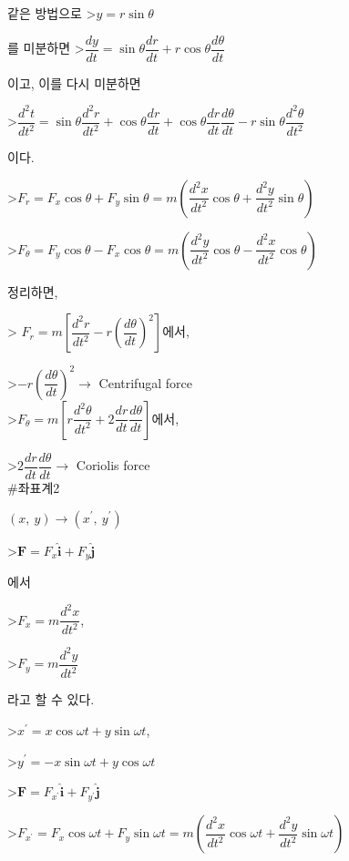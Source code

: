 같은 방법으로 
>$ y = r \sin \theta $ 

를 미분하면
>$\dfrac{dy}{dt} = \sin \theta \dfrac{dr}{dt} + r \cos \theta \dfrac{d\theta}{dt}$ 

이고, 이를 다시 미분하면

>$\dfrac{d^{2}t}{dt^{2}} = \sin \theta \dfrac{d^{2}r}{dt^{2}} + \cos \theta \dfrac{dr}{dt} + \cos \theta \dfrac{dr}{dt} \dfrac{d\theta}{dt} -r \sin \theta \dfrac{d^{2}\theta}{dt^{2}}$

이다. 

>$ F_{r} = F_{x} \cos \theta + F_{y} \sin \theta 
= m \left ( \dfrac{d^{2}x}{dt^{2}} \cos \theta + \dfrac{d^{2}y}{dt^{2}} \sin \theta \right) $

>$ F_{\theta} = F_{y} \cos \theta - F_{x} \cos \theta 
= m \left ( \dfrac{d^{2}y}{dt^{2}} \cos \theta - \dfrac{d^{2}x}{dt^{2}} \cos \theta \right) $


정리하면, 

> $ F_{r} = m \left[ \dfrac{d^{2}r}{dt^{2}} - r \left( {\dfrac{d \theta}{dt}} \right)^{2} \right] $에서,

>$ -r \left( {\dfrac{d \theta}{dt}} \right)^{2} \rightarrow $ Centrifugal force \\

>$ F_{\theta} = m \left[ r \dfrac{d^{2}\theta}{dt^{2}} + 2 \dfrac{dr}{dt} \dfrac{d\theta}{dt}  \right] $에서, 

>$ 2 \dfrac{dr}{dt} \dfrac{d\theta}{dt} \rightarrow $ Coriolis force \\




#좌표계2

$ (x,~y) 	\rightarrow (x^{\prime},~y^{\prime})$

>$ \mathbf {F} = F_{x} \mathbf{\hat{i}} + F_{y} \mathbf{\hat{j}} $

에서 

>$ F_{x} = m \dfrac{d^{2}x}{dt^{2}}$, 

>$ F_{y} = m \dfrac{d^{2}y}{dt^{2}}$ 

라고 할 수 있다.

>$ x^{\prime} = x \cos \omega t + y \sin \omega t$, 

>$ y^{\prime} = -x \sin \omega t + y \cos \omega t$

>$ \mathbf {F} = F_{x^{\prime}} \mathbf {\hat{i}}  + F_{y^{\prime}} \mathbf {\hat{j}} $

>$ F_{x^{\prime}} = F_{x} \cos \omega t + F_{y} \sin \omega t
= m \left ( \dfrac{d^{2}x}{dt^{2}} \cos \omega t + \dfrac{d^{2}y}{dt^{2}} \sin \omega t \right) $

